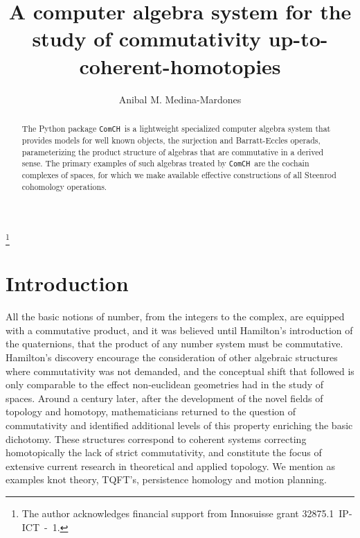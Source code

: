 \documentclass{amsart}
\newcommand{\comch}{\texttt{ComCH}}
\begin{document}
\title[A C.A.S. for the study of commutativity up-to-coherent-homotopies]{A computer algebra system for the study of commutativity up-to-coherent-homotopies}
\author{Anibal M. Medina-Mardones}
\address{Max Plank Institute for Mathematics, Bonn, Germany}
\address{Department of Mathematics, University of Notre Dame, Notre Dame, IN, USA}
\thanks{The author acknowledges financial support from Innosuisse grant \mbox{32875.1 IP-ICT - 1}.}

\begin{abstract}
	The Python package \comch\, is a lightweight specialized computer algebra system that provides models for well known objects, the surjection and Barratt-Eccles operads, parameterizing the product structure of algebras that are commutative in a derived sense. The primary examples of such algebras treated by \comch\, are the cochain complexes of spaces, for which we make available effective constructions of all Steenrod cohomology operations.
\end{abstract} 

\maketitle

\section{Introduction}

All the basic notions of number, from the integers to the complex, are equipped with a commutative product, and it was believed until Hamilton's introduction of the quaternions, that the product of any number system must be commutative. Hamilton's discovery encourage the consideration of other algebraic structures where commutativity was not demanded, and the conceptual shift that followed is only comparable to the effect non-euclidean geometries had in the study of spaces. Around a century later, after the development of the novel fields of topology and homotopy, mathematicians returned to the question of commutativity and identified additional levels of this property enriching the basic dichotomy. These structures correspond to coherent systems correcting homotopically the lack of strict commutativity, and constitute the focus of extensive current research in theoretical and applied topology. We mention as examples knot theory, TQFT's, persistence homology and motion planning.
\end{document}

